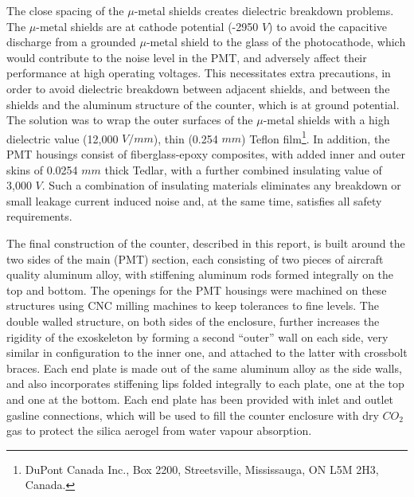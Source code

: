 The close spacing of the $\mu$-metal shields
creates dielectric breakdown problems.  The $\mu$-metal
shields are at cathode potential (-2950 $V$) to avoid the capacitive discharge
from a grounded $\mu$-metal shield to the glass of the photocathode, which
would contribute to the noise level in the PMT, and adversely affect their
performance at high operating voltages. This necessitates extra precautions, in
order to avoid dielectric breakdown between adjacent shields, and between the
shields and the aluminum structure of the counter, which is at ground
potential. The solution was to wrap the outer surfaces of the $\mu$-metal
shields with a high dielectric value (12,000 $V/mm$), thin (0.254 $mm$) Teflon
film\footnote{DuPont Canada Inc., Box 2200, Streetsville, Mississauga, ON L5M 2H3, Canada.}.
  In addition, the PMT housings consist of fiberglass-epoxy composites, 
with added inner and outer skins of 0.0254 $mm$ thick Tedlar\footnotemark[1],
with a further combined insulating value of 3,000 $V$.  
Such a combination of insulating materials eliminates any breakdown or small leakage
current induced noise and, at the same time, satisfies all safety requirements.

The final construction of the counter, described in this report, is built
around the two sides of the main (PMT) section, each consisting of two pieces
of aircraft quality aluminum alloy, with stiffening aluminum rods formed
integrally on the top and bottom.  
The openings for the PMT housings were machined on these structures using CNC 
milling machines to keep tolerances to fine levels.  
The double walled structure, on both sides of the enclosure, further increases 
the rigidity of the exoskeleton by forming a second ``outer'' wall on each side, 
very similar in configuration to the inner one, and attached to the latter with 
crossbolt braces.
Each end plate is made out of the same aluminum alloy as the side walls, and
also incorporates stiffening lips folded integrally to each plate, one at the
top and one at the bottom.  Each end plate has been provided with inlet and
outlet gasline connections, which will be used to fill the counter enclosure
with dry $CO_2$ gas to protect the silica aerogel from water vapour absorption.

